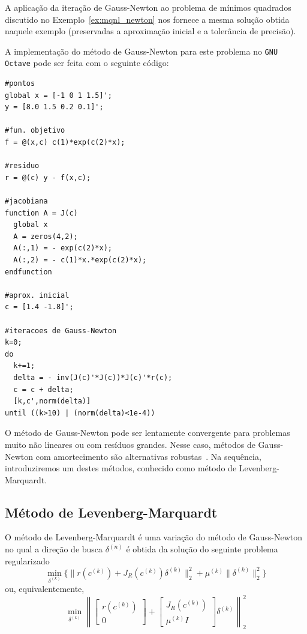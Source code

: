 \begin{ex}
  A aplicação da iteração de Gauss-Newton ao problema de mínimos quadrados discutido no Exemplo~\ref{ex:mqnl_newton} nos fornece a mesma solução obtida naquele exemplo (preservadas a aproximação inicial e a tolerância de precisão).

\ifisoctave
A implementação do método de Gauss-Newton para este problema no \verb+GNU Octave+ pode ser feita com o seguinte código:
\begin{verbatim}
#pontos
global x = [-1 0 1 1.5]';
y = [8.0 1.5 0.2 0.1]';

#fun. objetivo
f = @(x,c) c(1)*exp(c(2)*x);

#residuo
r = @(c) y - f(x,c);

#jacobiana
function A = J(c)
  global x
  A = zeros(4,2);
  A(:,1) = - exp(c(2)*x);
  A(:,2) = - c(1)*x.*exp(c(2)*x);
endfunction

#aprox. inicial
c = [1.4 -1.8]';

#iteracoes de Gauss-Newton
k=0;
do
  k+=1;
  delta = - inv(J(c)'*J(c))*J(c)'*r(c);
  c = c + delta;
  [k,c',norm(delta)]
until ((k>10) | (norm(delta)<1e-4))
\end{verbatim}
\fi
\end{ex}

O método de Gauss-Newton pode ser lentamente convergente para problemas muito não lineares ou com resíduos grandes. Nesse caso, métodos de Gauss-Newton com amortecimento são alternativas robustas~\cite{Bjorck1996a,Nocedal2006a}. Na sequência, introduziremos um destes métodos, conhecido como método de Levenberg-Marquardt.

\subsection{Método de Levenberg-Marquardt}

O método de Levenberg-Marquardt é uma variação do método de Gauss-Newton no qual a direção de busca $\delta^{(n)}$ é obtida da solução do seguinte problema regularizado
\begin{equation} \label{eq:mq_gn0}
  \min_{\delta^{(k)}} \{\|r(c^{(k)}) + J_R(c^{(k)})\delta^{(k)}\|_2^2 + \mu^{(k)}\|\delta^{(k)}\|_2^2\}
\end{equation}
ou, equivalentemente,
\begin{equation} \label{eq:mq_gn0}
  \min_{\delta^{(k)}} \left\|
    \begin{bmatrix}
      r(c^{(k)})\\
      0
    \end{bmatrix} +
    \begin{bmatrix}
      J_R(c^{(k)})\\
      \mu^{(k)}I
    \end{bmatrix}
    \delta^{(k)}\right\|_2^2
\end{equation}

